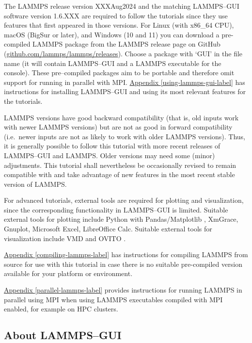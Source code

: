 \documentclass[9pt,tutorial]{livecoms}
\begin{document}
The LAMMPS release version XXXAug2024 \cite{lammps_code} and the
matching LAMMPS--GUI software version 1.6.XXX are required to follow the
tutorials since they use features that first appeared in those versions.
For Linux (with x86\_64 CPU), macOS (BigSur or later), and Windows (10
and 11) you can download a pre-compiled LAMMPS package from the LAMMPS
release page on GitHub
(\href{https://github.com/lammps/lammps/releases}{github.com/lammps/lammps/releases}).
Choose a package with `GUI' in the file name (it will contain
LAMMPS--GUI and a LAMMPS executable for the console).  These
pre--compiled packages aim to be portable and therefore omit support for
running in parallel with MPI. \hyperref[using-lammps-gui-label]{Appendix
  \ref{using-lammps-gui-label}} has instructions for installing
LAMMPS--GUI and using its most relevant features for the
tutorials.

LAMMPS versions have good backward compatibility (that is, old inputs
work with newer LAMMPS versions) but are not as good in forward
compatibility (i.e.~newer inputs are not as likely to work with older
LAMMPS versions).  Thus, it is generally possible to follow this
tutorial with more recent releases of LAMMPS--GUI and LAMMPS.  Older
versions may need some (minor) adjustments.  This tutorial shall
nevertheless be occasionally revised to remain compatible with and take
advantage of new features in the most recent stable version of LAMMPS.

For advanced tutorials, external tools are required for plotting and
visualization, since the corresponding functionality in LAMMPS--GUI is
limited.  Suitable external tools for plotting include Python with
Pandas/Matplotlib \cite{van1995python,hunter2007Matplotlib}, XmGrace,
Gnuplot, Microsoft Excel, LibreOffice Calc.  Suitable external tools for
visualization include VMD \cite{vmd_home,humphrey1996vmd} and OVITO
\cite{ovito_home,ovito_paper}.

\hyperref[compiling-lammps-label]{Appendix \ref{compiling-lammps-label}}
has instructions for compiling LAMMPS from source for use with this
tutorial in case there is no suitable pre-compiled version available
for your platform or environment.

\hyperref[parallel-lammps-label]{Appendix \ref{parallel-lammps-label}}
provides instructions for running LAMMPS in parallel using MPI when
using LAMMPS executables compiled with MPI enabled, for example on HPC
clusters.

\subsection{About LAMMPS--GUI}
\end{document}
